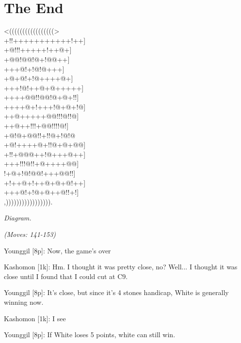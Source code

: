 \documentclass[12pt,draft]{memoir}
\newcounter{GoFigure}[part]
\newcommand{\gofigure}{%
 \stepcounter{GoFigure}
 \centerline{\textit{Diagram.\thinspace\arabic{GoFigure}}}
}
\newcommand{\subtext}[1]{\centerline{\textit{#1}}}
\begin{document}
\chapter{The End}
{\centering
{}
{\gnos
<(((((((((((((((((>\\
+!!+++++++++++!++]\\
+@!!!+++++!++@+]\\
+@@!@@!@+!@@++]\\
+++@!+!@!@+++]\\
+@+@!+!@++++@+]\\
+++!@!++@+@+++++]\\
++++@@!!@@!@+@+!!]\\
++++@+!+++!@+@+!@]\\
++@+++++@@!!!@!!@]\\
++@++!!!+@@!!!!@!]\\
+@!@+@@!!+!!@+!@!@\\
+@!++++@+!!@+@+@@]\\
+!!+@@@++!@+++@++]\\
+++!!!@!!+@++++@@]\\
!+@+!@!@@!+++@@!!]\\
+!++@+!++@+@+@!++]\\
+++@!+!@+@++@!!+!]\\
,))))))))))))))))).\\
}
}
\gofigure

\subtext{(Moves: 141-153)}

Younggil [8p]: Now, the game's over

Kashomon [1k]: Hm. I thought it was pretty close, no? Well... I thought it was close until I found that I could cut at C9.

Younggil [8p]: It's close, but since it's 4 stones handicap, White is generally winning now.

Kashomon [1k]: I see

Younggil [8p]: If White loses 5 points, white can still win.
\end{document}
